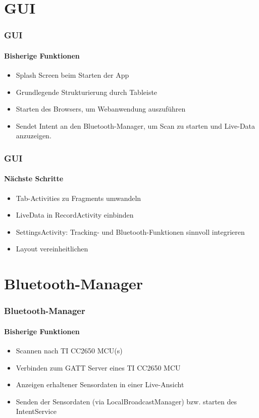 \documentclass{beamer}
\begin{document}


\section{GUI}

\begin{frame}
\frametitle{GUI}
\framesubtitle{Bisherige Funktionen}
\begin{itemize}
  \item Splash Screen beim Starten der App
  \item Grundlegende Strukturierung durch Tableiste
  \item Starten des Browsers, um Webanwendung auszuf\"uhren
  \item Sendet Intent an den Bluetooth-Manager, um Scan zu starten und Live-Data anzuzeigen.
\end{itemize}
\end{frame}

\begin{frame}
\frametitle{GUI}
\framesubtitle{N\"achste Schritte}
\begin{itemize}
  \item Tab-Activities zu Fragments umwandeln
  \item LiveData in RecordActivity einbinden
  \item SettingsActivity: Tracking- und Bluetooth-Funktionen sinnvoll integrieren
  \item Layout vereinheitlichen
\end{itemize}
\end{frame}


\section{Bluetooth-Manager}


\begin{frame}
\frametitle{Bluetooth-Manager}
\framesubtitle{Bisherige Funktionen}
\begin{itemize}
  \item Scannen nach TI CC2650 MCU(s)
  \item Verbinden zum GATT Server eines TI CC2650 MCU
  \item Anzeigen erhaltener Sensordaten in einer Live-Ansicht
  \item Senden der Sensordaten (via LocalBroadcastManager) bzw. starten des IntentService
\end{itemize}
\end{frame}
\end{document}
